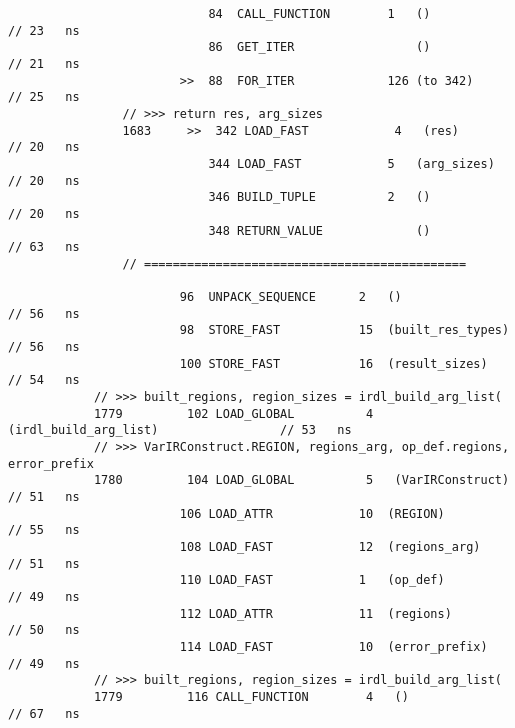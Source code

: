 \begin{code}
\begin{verbatim}
                            84  CALL_FUNCTION        1   ()                                 // 23   ns
                            86  GET_ITER                 ()                                 // 21   ns
                        >>  88  FOR_ITER             126 (to 342)                           // 25   ns
                // >>> return res, arg_sizes
                1683     >>  342 LOAD_FAST            4   (res)                             // 20   ns
                            344 LOAD_FAST            5   (arg_sizes)                        // 20   ns
                            346 BUILD_TUPLE          2   ()                                 // 20   ns
                            348 RETURN_VALUE             ()                                 // 63   ns
                // =============================================

                        96  UNPACK_SEQUENCE      2   ()                                     // 56   ns
                        98  STORE_FAST           15  (built_res_types)                      // 56   ns
                        100 STORE_FAST           16  (result_sizes)                         // 54   ns
            // >>> built_regions, region_sizes = irdl_build_arg_list(
            1779         102 LOAD_GLOBAL          4   (irdl_build_arg_list)                 // 53   ns
            // >>> VarIRConstruct.REGION, regions_arg, op_def.regions, error_prefix
            1780         104 LOAD_GLOBAL          5   (VarIRConstruct)                      // 51   ns
                        106 LOAD_ATTR            10  (REGION)                               // 55   ns
                        108 LOAD_FAST            12  (regions_arg)                          // 51   ns
                        110 LOAD_FAST            1   (op_def)                               // 49   ns
                        112 LOAD_ATTR            11  (regions)                              // 50   ns
                        114 LOAD_FAST            10  (error_prefix)                         // 49   ns
            // >>> built_regions, region_sizes = irdl_build_arg_list(
            1779         116 CALL_FUNCTION        4   ()                                    // 67   ns


\end{verbatim}
\end{code}
